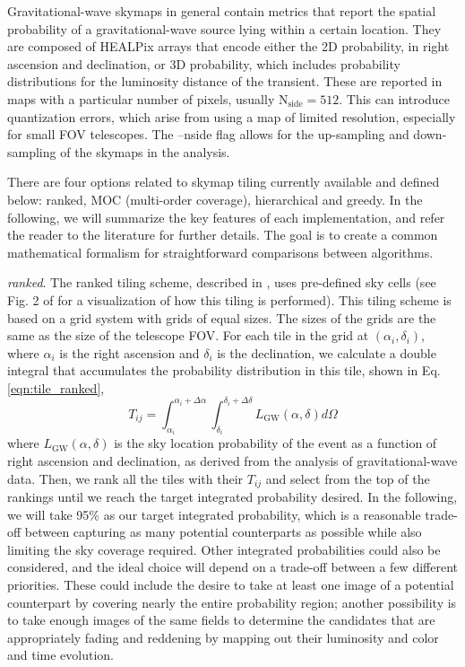 \documentclass[twocolumn]{aastex62}
\begin{document}
\begin{figure}[t]
    \label{fig:tiling}
\end{figure}
Gravitational-wave skymaps in general contain metrics that report the spatial probability of a gravitational-wave source lying within a certain location.
They are composed of HEALPix arrays that encode either the 2D probability, in right ascension and declination, or 3D probability, which includes probability distributions for the luminosity distance of the transient.
These are reported in maps with a particular number of pixels, usually $\textrm{N}_\textrm{side} = 512$. 
This can introduce quantization errors, which arise from using a map of limited resolution, especially for small FOV telescopes. 
The --nside flag allows for the up-sampling and down-sampling of the skymaps in the analysis.

There are four options related to skymap tiling currently available and defined below: ranked, MOC (multi-order coverage), hierarchical and greedy.
In the following, we will summarize the key features of each implementation, and refer the reader to the literature for further details.
The goal is to create a common mathematical formalism for straightforward comparisons between algorithms.

\emph{ranked}. The ranked tiling scheme, described in \cite{GhBl2016}, uses pre-defined sky cells (see Fig. 2 of \cite{GhBl2016} for a visualization of how this tiling is performed). This tiling scheme is based on a grid system with grids of equal sizes. The sizes of the grids are the same as the size of the telescope FOV. For each tile in the grid at $(\alpha_i, \delta_i)$, where $\alpha_i$ is the right ascension and $\delta_i$ is the declination, we calculate a double integral that accumulates the probability distribution in this tile, shown in Eq.\ref{eqn:tile_ranked},
\begin{equation}\label{eqn:tile_ranked}
T_{ij} = \int_{\alpha_i}^{\alpha_i+\Delta \alpha}\int_{\delta_i}^{\delta_i+\Delta \delta}L_\textrm{GW}(\alpha,\delta)d\Omega
\end{equation}
where $L_\textrm{GW}(\alpha,\delta)$ is the sky location probability of the event as a function of right ascension and declination, as derived from the analysis of gravitational-wave data.
Then, we rank all the tiles with their $T_{ij}$ and select from the top of the rankings until we reach the target integrated probability desired.
In the following, we will take 95\% as our target integrated probability, which is a reasonable trade-off between capturing as many potential counterparts as possible while also limiting the sky coverage required. Other integrated probabilities could also be considered, and the ideal choice will depend on a trade-off between a few different priorities. These could include the desire to take at least one image of a potential counterpart by covering nearly the entire probability region; another possibility is to take enough images of the same fields to determine the candidates that are appropriately fading and reddening by mapping out their luminosity and color and time evolution.
\end{document}
